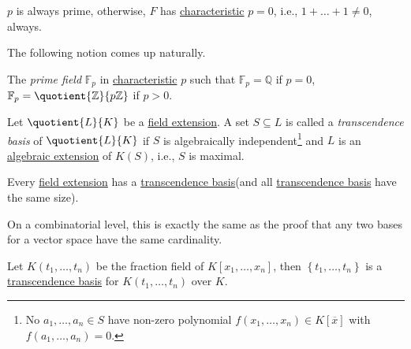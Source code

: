 
\begin{remark}
	\(p\) is always prime, otherwise, \(F\) has \hyperref[def:characteristic]{characteristic} \(p = 0\), i.e., \(1 + \ldots + 1 \neq 0\), always.
\end{remark}

The following notion comes up naturally.

\begin{definition}\label{def:prime-field}
	The \emph{prime field} \(\mathbb{F} _p\) in \hyperref[def:characteristic]{characteristic} \(p\) such that \(\mathbb{F} _p = \mathbb{Q} \) if \(p = 0\), \(\mathbb{F} _p = \quotient{\mathbb{Z} }{p\mathbb{Z} } \) if \(p > 0\).
\end{definition}

\begin{definition}\label{def:transcendence-basis}
	Let \(\quotient{L}{K} \) be a \hyperref[def:field-extension]{field extension}. A set \(S \subseteq L\) is called a \emph{transcendence basis} of \(\quotient{L}{K} \) if \(S\) is algebraically independent\footnote{No \(a_1, \ldots , a_n\in S\) have non-zero polynomial \(f(x_1, \ldots , x_n) \in K[\overline{x} ]\) with \(f(a_1, \ldots , a_n) = 0\).} and \(L\) is an \hyperref[def:algebraic-extension]{algebraic extension} of \(K(S)\), i.e., \(S\) is maximal.
\end{definition}

\begin{remark}
	Every \hyperref[def:field-extension]{field extension} has a \hyperref[def:transcendence-basis]{transcendence basis}(and all \hyperref[def:transcendence-basis]{transcendence basis} have the same size).
\end{remark}
\begin{explanation}
	On a combinatorial level, this is exactly the same as the proof that any two bases for a vector space have the same cardinality.
\end{explanation}

\begin{eg}
	Let \(K(t_1, \ldots , t_n)\) be the fraction field of \(K[x_1, \ldots , x_n]\), then \(\left\{ t_1, \ldots , t_n \right\} \) is a \hyperref[def:transcendence-basis]{transcendence basis} for \(K(t_1, \ldots , t_n)\) over \(K\).
\end{eg}

